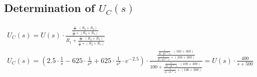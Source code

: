 \documentclass[a4paper]{article}
\begin{document}
\subsection{Determination of $U_C(s)$}
\begin{align*}
	U_C(s) = U(s) \cdot \frac{\frac{\frac{1}{sc}\cdot (R_2+R_3)}{\frac{1}{sc} + (R_2+R_3)}}{R_1 + \frac{\frac{1}{sc}\cdot (R_2+R_3)}{\frac{1}{sc} + (R_2+R_3)}}\\
	U_C(s) = \left(2.5 \cdot \frac{1}{s} - 625 \cdot \frac{1}{s^2} + 625 \cdot \frac{1}{s^2} \cdot e^{-2.5} \right) \cdot \frac{\frac{\frac{1}{25\cdot10^{-6}\cdot s}\cdot (100+300)}{\frac{1}{25\cdot10^{-6}\cdot s} + (100+300)}}
	{100 + \frac{\frac{1}{25\cdot10^{-6}\cdot s}\cdot (100+300)}{\frac{1}{25\cdot10^{-6}\cdot s} + (100+300)}} =
	U(s) \cdot \frac{400}{s+500}\\
\end{align*}
\end{document}
